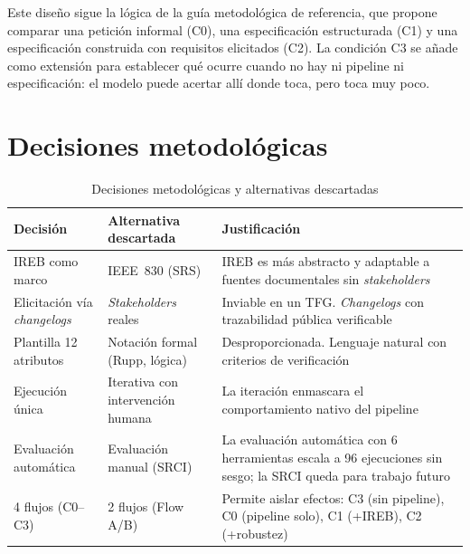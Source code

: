 Este dise\~no sigue la l\'ogica de la gu\'ia metodol\'ogica de referencia, que propone comparar una petici\'on informal (C0), una especificaci\'on estructurada (C1) y una especificaci\'on construida con requisitos elicitados (C2). La condici\'on C3 se a\~nade como extensi\'on para establecer qu\'e ocurre cuando no hay ni pipeline ni especificaci\'on: el modelo puede acertar all\'i donde toca, pero toca muy poco.

\section{Decisiones metodol\'ogicas}

\begin{table}[htbp]
\centering
\caption{Decisiones metodol\'ogicas y alternativas descartadas}
\label{tab:decisiones}
\begin{tabularx}{\textwidth}{lXX}
\toprule
\textbf{Decisi\'on} & \textbf{Alternativa descartada} & \textbf{Justificaci\'on} \\
\midrule
IREB como marco & IEEE~830 (SRS) & IREB es m\'as abstracto y adaptable a fuentes documentales sin \emph{stakeholders} \\
Elicitaci\'on v\'ia \emph{changelogs} & \emph{Stakeholders} reales & Inviable en un TFG. \emph{Changelogs} con trazabilidad p\'ublica verificable \\
Plantilla 12 atributos & Notaci\'on formal (Rupp, l\'ogica) & Desproporcionada. Lenguaje natural con criterios de verificaci\'on \\
Ejecuci\'on \'unica & Iterativa con intervenci\'on humana & La iteraci\'on enmascara el comportamiento nativo del pipeline \\
Evaluaci\'on autom\'atica & Evaluaci\'on manual (SRCI) & La evaluaci\'on autom\'atica con 6 herramientas escala a 96 ejecuciones sin sesgo; la SRCI queda para trabajo futuro \\
4 flujos (C0--C3) & 2 flujos (Flow A/B) & Permite aislar efectos: C3 (sin pipeline), C0 (pipeline solo), C1 (+IREB), C2 (+robustez) \\
\bottomrule
\end{tabularx}
\end{table}
